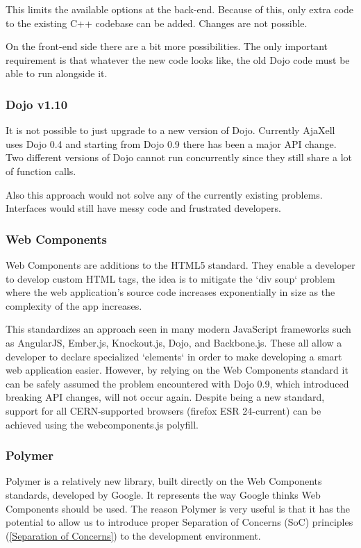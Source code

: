 \documentclass[journal]{IEEEtran}
\begin{document}
This limits the available options at the back-end. Because of this, only extra
code to the existing C++ codebase can be added. Changes are not possible.

On the front-end side there are a bit more possibilities.
The only important requirement is that whatever the new code looks like, the old
Dojo code must be able to run alongside it.
\subsubsection{Dojo v1.10}
It is not possible to just upgrade to a new version of Dojo. Currently AjaXell
uses Dojo 0.4 and starting from Dojo 0.9 there has been a major API change.
Two different versions of Dojo cannot run concurrently since they still share
a lot of function calls.

Also this approach would not solve any of the currently existing problems.
Interfaces would still have messy code and frustrated developers.
\subsubsection{Web Components}
Web Components\cite{WebComponentsW3C}\cite{WebcomponentsMozilla} are additions to the HTML5 standard. They
enable a developer to develop custom HTML tags, the idea is to mitigate the
`div soup` problem\cite{DivSoup} where the web application's source code increases
exponentially in size as the complexity of the app increases.

This standardizes an approach seen in many modern JavaScript frameworks such as
AngularJS, Ember.js, Knockout.js, Dojo, and Backbone.js. These all allow a developer to
declare specialized `elements` in order to make developing a smart web application
easier.
However, by relying on the Web Components standard it can be safely assumed the
problem encountered with Dojo 0.9, which introduced breaking API changes, will
not occur again.
Despite being a new standard, support for all CERN-supported
browsers (firefox ESR 24-current) can be achieved using the webcomponents.js polyfill.
\subsubsection{Polymer}
Polymer is a relatively new library, built directly on the Web Components
standards, developed by Google. It represents the way Google thinks Web
Components should be used.
The reason Polymer is very useful is that it has the potential
to allow us to introduce proper Separation of Concerns (SoC) principles
(\ref{Separation of Concerns}) to the development environment.
\end{document}
